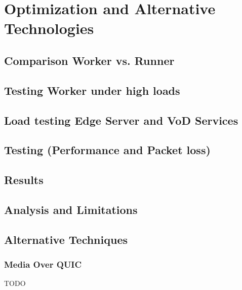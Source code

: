 
\chapter{Optimization and Alternative Technologies}\label{chapter:introduction}

\section{Comparison Worker vs. Runner}
\section{Testing Worker under high loads}
\section{Load testing Edge Server and VoD Services}
\section{Testing (Performance and Packet loss)}
\section{Results}
\section{Analysis and Limitations}
\section{Alternative Techniques}

\subsection{Media Over QUIC}

TODO